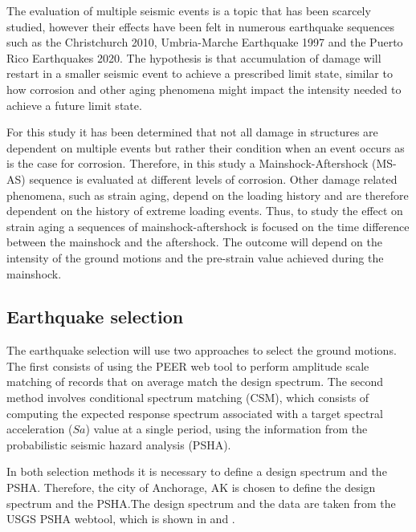 The evaluation of multiple seismic events is a topic that has been scarcely studied, however their effects have been felt in numerous earthquake sequences such as the Christchurch 2010, Umbria-Marche Earthquake 1997 and the Puerto Rico Earthquakes 2020. The hypothesis is that accumulation of damage will restart in a smaller seismic event to achieve a prescribed limit state, similar to how corrosion and other aging phenomena might impact the intensity needed to achieve a future limit state. 

For this study it has been determined that not all damage in structures are dependent on multiple events but rather their condition when an event occurs as is the case for corrosion. Therefore, in this study a Mainshock-Aftershock (MS-AS) sequence is evaluated at different levels of corrosion. Other damage related phenomena, such as strain aging, depend on the loading history and are therefore dependent on the history of extreme loading events. Thus, to study the effect on strain aging a sequences of mainshock-aftershock is focused on the time difference between the mainshock and the aftershock. The outcome will depend on the intensity of the ground motions and the pre-strain value achieved during the mainshock.

\subsection{Earthquake selection}

The earthquake selection will use two approaches to select the ground motions. The first consists of using the PEER web tool to perform amplitude scale matching of records that on average match the design spectrum. The second method involves conditional spectrum matching (CSM), which consists of computing the expected response spectrum associated with a target spectral acceleration ($Sa$) value at a single period, using the information from the probabilistic seismic hazard analysis (PSHA).

In both selection methods it is necessary to define a design spectrum and the PSHA. Therefore, the city of Anchorage, AK is chosen to define the design spectrum and the PSHA.The design spectrum and the data are taken from the USGS PSHA webtool, which is shown in  and . 

